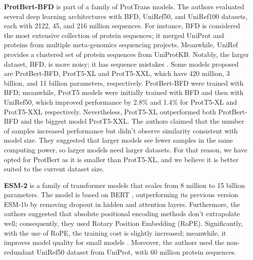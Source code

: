 \textbf{ProtBert-BFD} is part of a family of ProtTrans \cite{elnaggar2021prottrans} models. The authors evaluated several deep learning architectures with BFD, UniRef50, and UniRef100 datasets, each with 2122, 45, and 216 million sequences. For instance, BFD is considered the most extensive collection of protein sequences; it merged UniProt \cite{uniprot2019uniprot} and proteins from multiple meta-genomics sequencing projects. Meanwhile, UniRef \cite{suzek2015uniref} provides a clustered set of protein sequences from UniProtKB. Notably, the larger dataset, BFD, is more noisy; it has sequence mistakes \cite{elnaggar2021prottrans}. Some models proposed are ProtBert-BFD, ProtT5-XL and ProtT5-XXL, which have 420 million, 3 billion, and 11 billion parameters, respectively. ProtBert-BFD were trained with BFD; meanwhile, ProtT5 models were initially trained with BFD and then with UniRef50, which improved performance by 2.8\% and 1.4\% for ProtT5-XL and ProtT5-XXL respectively. Nevertheless, ProtT5-XL outperformed both ProtBert-BFD and the biggest model ProtT5-XXL. The authors claimed that the number of samples increased performance but didn't observe similarity consistent with model size. They suggested that larger models see fewer samples in the same computing power, so larger models need larger datasets. For that reason, we have opted for ProtBert as it is smaller than ProtT5-XL, and we believe it is better suited to the current dataset size.



\textbf{ESM-2} \cite{lin2023evolutionary} is a family of transformer models that scales from 8 million to 15 billion parameters. The model is based on BERT \cite{devlin2018bert}, outperforming its previous version ESM-1b \cite{rives2021biological} by removing dropout in hidden and attention layers. Furthermore, the authors suggested that absolute positional encoding methods don't extrapolate well; consequently, they used Rotary Position Embedding (RoPE). Significantly, with the use of RoPE, the training cost is slightly increased; meanwhile, it improves model quality for small models \cite{lin2023evolutionary}. Moreover, the authors used the non-redundant  UniRef50 \cite{suzek2015uniref} dataset from UniProt, with 60 million protein sequences. 


